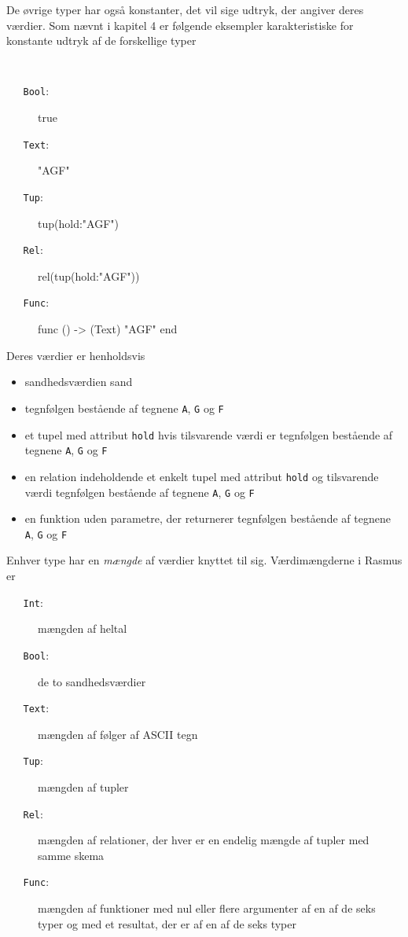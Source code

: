 De \o{}vrige typer har ogs\aa{} konstanter, det vil sige udtryk,
der angiver deres v\ae{}rdier. Som n\ae{}vnt i kapitel 4 er
f\o{}lgende eksempler karakteristiske for konstante udtryk af de
forskellige typer
{\tt
\begin{description}%
\item[{\tt ~~~Bool}:] true 
\item[{\tt ~~~Text}:] "AGF"
\item[{\tt ~~~Tup}:] tup(hold:"AGF")
\item[{\tt ~~~Rel}:] rel(tup(hold:"AGF"))
\item[{\tt ~~~Func}:] func () -> (Text) "AGF" end
\end{description}
}
Deres v\ae{}rdier er henholdsvis
\begin{itemize}
\item sandhedsv\ae{}rdien sand
\item tegnf\o{}lgen best\aa{}ende af tegnene \verb"A", \verb"G" og \verb"F"
\item et tupel med attribut \verb"hold" hvis tilsvar\-en\-de v\ae{}rdi er
tegnf\o{}lgen best\aa{}\-en\-de af tegnene \verb"A", \verb"G" og \verb"F"
\item en relation indeholdende et enkelt tupel med attribut \verb"hold" og
til\-svar\-en\-de v\ae{}rdi
tegnf\o{}lgen best\aa{}ende af tegnene \verb"A", \verb"G" og \verb"F"
\item en funktion uden parametre, der returnerer tegnf\o{}lgen best\aa{}\-en\-de 
af tegnene \verb"A", \verb"G" og \verb"F"
\end{itemize}
Enhver type har en {\em m\ae{}ngde\/} af v\ae{}rdier knyttet til sig.
V\ae{}rdim\ae{}ngderne i {\sc Rasmus} er
\begin{description}%
\item[{\tt ~~~Int}:] m\ae{}ngden af heltal
\item[{\tt ~~~Bool}:] de to sandhedsv\ae{}rdier
\item[{\tt ~~~Text}:] m\ae{}ngden af f\o{}lger af ASCII tegn
\item[{\tt ~~~Tup}:] m\ae{}ngden af tupler
\item[{\tt ~~~Rel}:] m\ae{}ngden af relationer, der hver er en endelig
m\ae{}ngde af tupler med samme skema
\item[{\tt ~~~Func}:] m\ae{}ngden af funktioner med nul eller flere
argumenter af en af de seks typer og med et resultat, der er af en af de seks
typer
\end{description}
